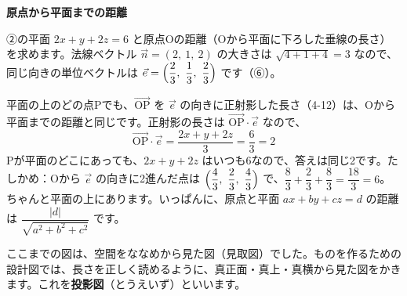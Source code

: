 \begin{motto}[4]
\textbf{原点から平面までの距離}\par
②の平面 $2x+y+2z=6$ と原点Oの距離（Oから平面に下ろした垂線の長さ）を求めます。法線ベクトル $\vec n=(2,\ 1,\ 2)$ の大きさは $\sqrt{4+1+4}=3$ なので、同じ向きの単位ベクトルは $\vec e=\Bigl(\dfrac{2}{3},\ \dfrac{1}{3},\ \dfrac{2}{3}\Bigr)$ です（⑥）。

平面の上のどの点Pでも、$\overrightarrow{\mathrm{OP}}$ を $\vec e$ の向きに正射影した長さ（4-12）は、Oから平面までの距離と同じです。正射影の長さは $\overrightarrow{\mathrm{OP}}\cdot\vec e$ なので、
\[ \overrightarrow{\mathrm{OP}}\cdot\vec e=\frac{2x+y+2z}{3}=\frac{6}{3}=2 \]
Pが平面のどこにあっても、$2x+y+2z$ はいつも6なので、答えは同じ2です。たしかめ：Oから $\vec e$ の向きに2進んだ点は $\Bigl(\dfrac{4}{3},\ \dfrac{2}{3},\ \dfrac{4}{3}\Bigr)$ で、$\dfrac{8}{3}+\dfrac{2}{3}+\dfrac{8}{3}=\dfrac{18}{3}=6$。ちゃんと平面の上にあります。いっぱんに、原点と平面 $ax+by+cz=d$ の距離は $\dfrac{|d|}{\sqrt{a^2+b^2+c^2}}$ です。
\end{motto}


\leavevmode\label{bk:4-13:toei}ここまでの図は、空間をななめから見た図（見取図）でした。ものを作るための設計図では、長さを正しく読めるように、真正面・真上・真横から見た図をかきます。これを\textbf{投影図}（とうえいず）といいます。

